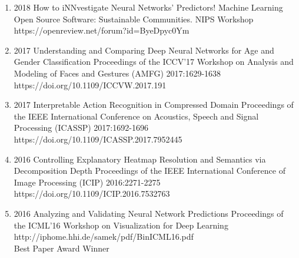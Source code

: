 {\begin{enumerate}
        \item {}
                                {2018}
                                {How to iNNvestigate Neural Networks' Predictors!}
                                {Machine Learning Open Source Software: Sustainable Communities. NIPS Workshop}
                                {}
                                {https://openreview.net/forum?id=ByeDpyc0Ym}


        \item {}
                                {2017}
                                {Understanding and Comparing Deep Neural Networks for Age and Gender Classification}
                                {Proceedings of the ICCV'17 Workshop on Analysis and Modeling of Faces and Gestures (AMFG)}
                                {2017:1629-1638}
                                {https://doi.org/10.1109/ICCVW.2017.191}

        \item {}
                                {2017}
                                {Interpretable Action Recognition in Compressed Domain}
                                {Proceedings of the IEEE International Conference on Acoustics, Speech and Signal Processing (ICASSP)}
                                {2017:1692-1696}
                                {https://doi.org/10.1109/ICASSP.2017.7952445}


        \item {}
                                {2016}
                                {Controlling Explanatory Heatmap Resolution and Semantics via Decomposition Depth}
                                {Proceedings of the IEEE International Conference of Image Processing (ICIP)}
                                {2016:2271-2275}
                                {https://doi.org/10.1109/ICIP.2016.7532763}


        \item {}
                                {2016}
                                {Analyzing and Validating Neural Network Predictions}
                                {Proceedings of the ICML'16 Workshop on Visualization for Deep Learning}
                                {}
                                {http://iphome.hhi.de/samek/pdf/BinICML16.pdf}
                                {\\Best Paper Award Winner}


\end{enumerate}}
